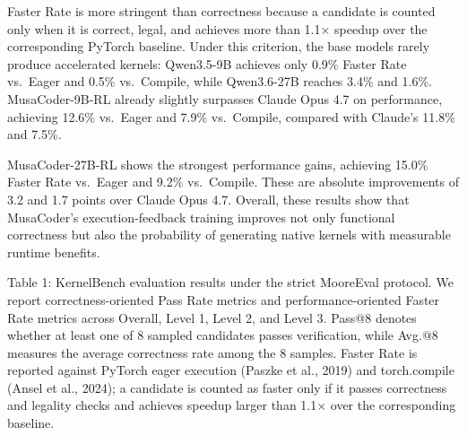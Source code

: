 \documentclass[
  10
]{article}
\begin{document}
Faster Rate is more stringent than correctness because a candidate is
counted only when it is correct, legal, and achieves more than 1.1×
speedup over the corresponding PyTorch baseline. Under this criterion,
the base models rarely produce accelerated kernels: Qwen3.5-9B achieves
only 0.9\% Faster Rate vs.~Eager and 0.5\% vs.~Compile, while
Qwen3.6-27B reaches 3.4\% and 1.6\%. MusaCoder-9B-RL already slightly
surpasses Claude Opus 4.7 on performance, achieving 12.6\% vs.~Eager and
7.9\% vs.~Compile, compared with Claude's 11.8\% and 7.5\%.

MusaCoder-27B-RL shows the strongest performance gains, achieving 15.0\%
Faster Rate vs.~Eager and 9.2\% vs.~Compile. These are absolute
improvements of 3.2 and 1.7 points over Claude Opus 4.7. Overall, these
results show that MusaCoder's execution-feedback training improves not
only functional correctness but also the probability of generating
native kernels with measurable runtime benefits.

Table 1: KernelBench evaluation results under the strict MooreEval
protocol. We report correctness-oriented Pass Rate metrics and
performance-oriented Faster Rate metrics across Overall, Level 1, Level
2, and Level 3. Pass@8 denotes whether at least one of 8 sampled
candidates passes verification, while Avg.@8 measures the average
correctness rate among the 8 samples. Faster Rate is reported against
PyTorch eager execution (Paszke et al., 2019) and torch.compile (Ansel
et al., 2024); a candidate is counted as faster only if it passes
correctness and legality checks and achieves speedup larger than 1.1×
over the corresponding baseline.
\end{document}
